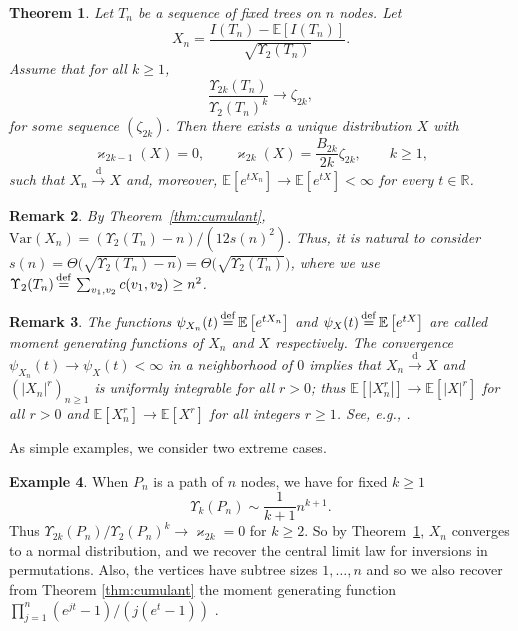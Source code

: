 \documentclass[11pt]{article}
\newcommand{\E}[1]{\mathbb{E} \left[#1\right]}
\newcommand{\Va}[1]{{\mathrm{Var}}\left(#1\right)}
\def\R{\mathbb{R}}
\newtheorem{theorem}{Theorem}
\numberwithin{theorem}{section}
\newtheorem{remark}[theorem]{Remark}
\theoremstyle{definition}
\newtheorem{example}[theorem]{Example}
\newcommand{\inlaw}{\dto}%
\newcommand{\eqd}{\,{\buildrel {\mathrm{def}} \over =}\,}
\numberwithin{equation}{section}
\newcommand{\refT}[1]{Theorem~\ref{#1}}
\newcommand\kk{\varkappa}
\newcommand\bigpar[1]{\bigl(#1\bigr)}
\newcommand{\too}{\longrightarrow}
\newcommand\dto{\overset{\mathrm{d}}{\too}}
\begin{document}
\begin{theorem}
    \label{thm:fixed}
    Let \(T_n\) be a sequence of fixed trees on $n$ nodes.
    Let
$$
    X_n =
    \frac{I(T_n)-\E {I(T_n)}}{\sqrt{\Upsilon_2(T_n)}}.
    $$
    Assume that for all \(k \ge 1\),
    \begin{equation}
        \frac{\Upsilon_{2k}(T_n)}{\Upsilon_2(T_n)^{k}}
        \to
        \zeta_{2k},
        \label{condition}
    \end{equation}
for some sequence \((\zeta_{2k})\).
    Then there exists a unique distribution $X$ with 
    \begin{equation}
        \kk_{2k-1}(X) = 0,
        \qquad
        \kk_{2k}(X) = \frac{B_{2k}}{2k} \zeta_{2k}, 
        \qquad k \ge 1,
    \end{equation}
    such that 
$X_n\dto X$ and, moreover,
\(\E{e^{tX_n}} \to \E{e^{tX}}<\infty\) for every $t \in \R$.
\end{theorem}

\begin{remark}
By \refT{thm:cumulant},
\( \Va{X_n} =  (\Upsilon_{2}(T_n)-n)/({12 s(n)^2}).\)
Thus, it is natural to consider
\(s(n) 
    = \Theta\bigpar{\sqrt{\Upsilon_{2}(T_n)-n}}
    = \Theta\bigpar{\sqrt{\Upsilon_{2}(T_n)}}
\), where we use \(\Upsilon_{2}(T_n) \eqd \sum_{v_1, v_2} c(v_1, v_2) \ge n^2\).
\end{remark}

\begin{remark}
    The functions \(\psi_{X_n}(t) \eqd \E{e^{tX_n}}\) and
    \(\psi_{X}(t) \eqd \E{e^{tX}}\) are called moment generating functions of \(X_n\) and \(X\) respectively.
The convergence \(\psi_{X_n}(t) \to \psi_{X}(t)<\infty\) in a neighborhood
    of \(0\) implies that \(X_{n} \inlaw X\) and  
    \( (|X_n|^{r})_{n \ge 1}\) is uniformly integrable for all \(r > 0\); 
thus \(\E{|X_{n}^r|} \to  \E{|X|^r}\) for all \(r > 0\)
and \(\E{X_{n}^r} \to  \E{X^r}\) for all integers \(r \ge1\).
See, e.g., \cite[Theorem 5.9.5]{g13}.
\end{remark}

As simple examples, we  consider two extreme cases.

\begin{example}
    When \(P_n\) is a path of \(n\) nodes, we have for fixed $k\geq 1$
    \[
        \Upsilon_{k}(P_n) \sim \frac{1}{k+1}n^{k+1}.
    \]
    Thus \(\Upsilon_{2k}(P_n)/\Upsilon_{2}(P_{n})^{k} \to \kk_{2k} =
    0\) for \(k \ge 2\).
    So by \refT{thm:fixed}, 
\(X_n\) converges to a normal distribution, and we recover the central 
    limit law for inversions in permutations.
    Also, the vertices have subtree sizes $1,\ldots, n$ and so we also recover 
from Theorem \ref{thm:cumulant}
    the moment generating
    function \(\prod_{j=1}^n ( e^{jt}-1)/(j(e^t-1))\) \cite{m01,s97}.
\end{example}
\end{document}
